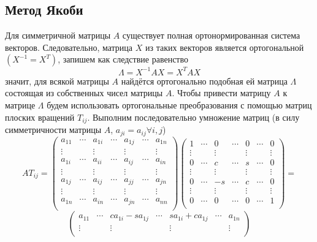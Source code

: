 \documentclass[11pt,a4paper]{article}
\renewcommand\;{\hspace{1cm}}
\begin{document}
\subsection{Метод Якоби}
Для симметричной матрицы $A$ существует полная ортонормированная система векторов. Следовательно, матрица $X$ из таких векторов является ортогональной $(X^{-1} = X^{T})$, запишем как следствие равенство \[
  \Lambda = X^{-1}AX = X^{T}AX
\]
значит, для всякой матрицы $A$ найдётся ортогонально подобная ей матрица $\Lambda$ состоящая из собственных чисел матрицы $A$. Чтобы привести матрицу $A$ к матрице $\Lambda$ будем использовать ортогональные преобразования с помощью матриц плоских вращений $T_{ij}$.
Выполним последовательно умножение матриц (в силу симметричности матрицы $A$, $a_{ji} = a_{ij} \forall i,j$)\[
  AT_{ij} = \begin{pmatrix}
    a_{11} & \cdots & a_{1i} & \cdots & a_{1j} & \cdots & a_{1n}\\
    \vdots & & \vdots & & \vdots & & \vdots \\
    a_{1i} & \cdots & a_{ii} & \cdots & a_{ij} & \cdots & a_{in}\\
    \vdots & & \vdots & & \vdots & & \vdots \\
    a_{1j} & \cdots & a_{ij} & \cdots & a_{jj} & \cdots & a_{jn}\\
    \vdots & & \vdots & & \vdots & & \vdots \\
    a_{1n} & \cdots & a_{in} & \cdots & a_{jn} & \cdots & a_{nn}\\
  \end{pmatrix} \begin{pmatrix}
    1 & \cdots & 0 & \cdots & 0 & \cdots & 0\\
    \vdots & & \vdots & & \vdots & & \vdots \\
    0 & \cdots & c & \cdots & s & \cdots & 0\\
    \vdots & & \vdots & & \vdots & & \vdots \\
    0 & \cdots & -s & \cdots & c & \cdots & 0\\
    \vdots & & \vdots & & \vdots & & \vdots \\
    0 & \cdots & 0 & \cdots & 0 & \cdots & 1\\
\end{pmatrix} =
\]\[
  \begin{pmatrix}
    a_{11} & \cdots & ca_{1i} - sa_{1j} & \cdots & sa_{1i}+ ca_{1j}& \cdots & a_{1n}\\
    \vdots & & \vdots & & \vdots & & \vdots \\

\end{pmatrix}\]
\end{document}
